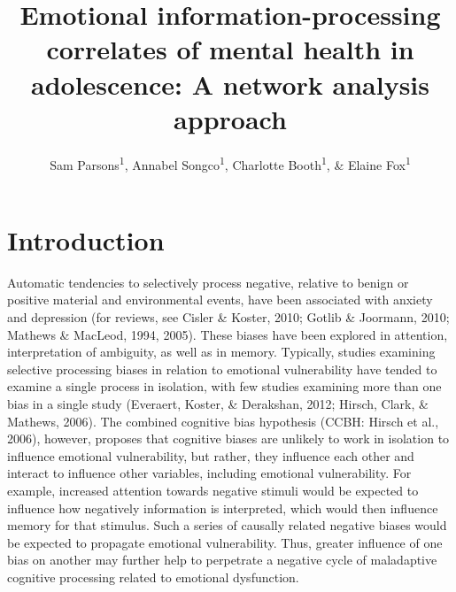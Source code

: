 \documentclass[man,floatsintext]{apa6}
\title{Emotional information-processing correlates of mental health in adolescence: A network analysis approach}
\author{Sam Parsons\textsuperscript{1}, Annabel Songco\textsuperscript{1}, Charlotte Booth\textsuperscript{1}, \& Elaine Fox\textsuperscript{1}}
\date{}
\affiliation{
\vspace{0.5cm}
\textsuperscript{1} University of Oxford}
\begin{document}
\maketitle

\hypertarget{introduction}{%
\section{Introduction}\label{introduction}}

Automatic tendencies to selectively process negative, relative to benign or positive material and environmental events, have been associated with anxiety and depression (for reviews, see Cisler \& Koster, 2010; Gotlib \& Joormann, 2010; Mathews \& MacLeod, 1994, 2005). These biases have been explored in attention, interpretation of ambiguity, as well as in memory. Typically, studies examining selective processing biases in relation to emotional vulnerability have tended to examine a single process in isolation, with few studies examining more than one bias in a single study (Everaert, Koster, \& Derakshan, 2012; Hirsch, Clark, \& Mathews, 2006). The combined cognitive bias hypothesis (CCBH: Hirsch et al., 2006), however, proposes that cognitive biases are unlikely to work in isolation to influence emotional vulnerability, but rather, they influence each other and interact to influence other variables, including emotional vulnerability. For example, increased attention towards negative stimuli would be expected to influence how negatively information is interpreted, which would then influence memory for that stimulus. Such a series of causally related negative biases would be expected to propagate emotional vulnerability. Thus, greater influence of one bias on another may further help to perpetrate a negative cycle of maladaptive cognitive processing related to emotional dysfunction.
\end{document}
